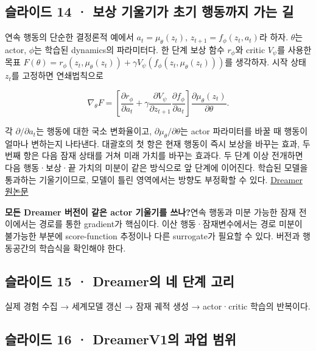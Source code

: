 \documentclass[11pt,a4paper]{article}
\begin{document}
\subsection{슬라이드 14 · 보상 기울기가 초기 행동까지 가는 길}

연속 행동의 단순한 결정론적 예에서 $a_t=\mu_\theta(z_t)$, $z_{t+1}=f_\phi(z_t,a_t)$라 하자. $\theta$는 actor, $\phi$는 학습된 dynamics의 파라미터다. 한 단계 보상 함수 $r_\phi$와 critic $V_\psi$를 사용한 목표 $F(\theta)=r_\phi(z_t,\mu_\theta(z_t))+\gamma V_\psi(f_\phi(z_t,\mu_\theta(z_t)))$를 생각하자. 시작 상태 $z_t$를 고정하면 연쇄법칙으로\par

\[
\nabla_\theta F=
\left[\frac{\partial r_\phi}{\partial a_t}
+\gamma\frac{\partial V_\psi}{\partial z_{t+1}}
\frac{\partial f_\phi}{\partial a_t}\right]
\frac{\partial\mu_\theta(z_t)}{\partial\theta}.
\]

각 $\partial/\partial a_t$는 행동에 대한 국소 변화율이고, $\partial\mu_\theta/\partial\theta$는 actor 파라미터를 바꿀 때 행동이 얼마나 변하는지 나타낸다. 대괄호의 첫 항은 현재 행동이 즉시 보상을 바꾸는 효과, 두 번째 항은 다음 잠재 상태를 거쳐 미래 가치를 바꾸는 효과다. 두 단계 이상 전개하면 다음 행동·보상·끝 가치의 미분이 같은 방식으로 앞 단계에 이어진다. 학습된 모델을 통과하는 기울기이므로, 모델이 틀린 영역에서는 방향도 부정확할 수 있다. \href{https://arxiv.org/abs/1912.01603}{Dreamer 원논문}\par

\par\medskip\noindent\textbf{모든 Dreamer 버전이 같은 actor 기울기를 쓰나?}\quad 연속 행동과 미분 가능한 잠재 전이에서는 경로를 통한 gradient가 핵심이다. 이산 행동·잠재변수에서는 경로 미분이 불가능한 부분에 score-function 추정이나 다른 surrogate가 필요할 수 있다. 버전과 행동공간의 학습식을 확인해야 한다.\par

\subsection{슬라이드 15 · Dreamer의 네 단계 고리}

실제 경험 수집 → 세계모델 갱신 → 잠재 궤적 생성 → actor·critic 학습의 반복이다.\par

\subsection{슬라이드 16 · DreamerV1의 과업 범위}
\end{document}
